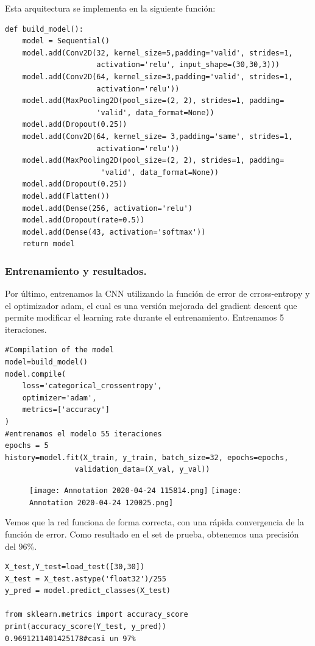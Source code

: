 \documentclass[a4paper,10pt]{article}
\begin{document}
Esta arquitectura se implementa en la siguiente función:
\begin{lstlisting}
def build_model():
    model = Sequential()
    model.add(Conv2D(32, kernel_size=5,padding='valid', strides=1, 
                     activation='relu', input_shape=(30,30,3)))
    model.add(Conv2D(64, kernel_size=3,padding='valid', strides=1,
                     activation='relu'))
    model.add(MaxPooling2D(pool_size=(2, 2), strides=1, padding=
                     'valid', data_format=None))
    model.add(Dropout(0.25))
    model.add(Conv2D(64, kernel_size= 3,padding='same', strides=1, 
                     activation='relu'))
    model.add(MaxPooling2D(pool_size=(2, 2), strides=1, padding=
                      'valid', data_format=None))
    model.add(Dropout(0.25))
    model.add(Flatten())
    model.add(Dense(256, activation='relu')
    model.add(Dropout(rate=0.5))
    model.add(Dense(43, activation='softmax'))
    return model
\end{lstlisting}

\subsubsection{Entrenamiento y resultados.}
Por último, entrenamos la CNN utilizando  la función de error de crross-entropy y el optimizador adam, el cual es una versión mejorada del gradient descent que permite modificar el learning rate durante el entrenamiento. Entrenamos 5 iteraciones.
\begin{lstlisting}
#Compilation of the model
model=build_model()
model.compile(
    loss='categorical_crossentropy', 
    optimizer='adam', 
    metrics=['accuracy']
)
#entrenamos el modelo 55 iteraciones
epochs = 5
history=model.fit(X_train, y_train, batch_size=32, epochs=epochs,
				validation_data=(X_val, y_val))
\end{lstlisting}
\begin{figure}[H]
\centering
\texttt{[image: Annotation 2020-04-24 115814.png]}\hfill
\texttt{[image: Annotation 2020-04-24 120025.png]}
\end{figure}

\noindent
Vemos que la red funciona de forma correcta, con una rápida convergencia de la función de error. Como resultado en el set de prueba, obtenemos una precisión del 96\%.

\begin{lstlisting}
X_test,Y_test=load_test([30,30])
X_test = X_test.astype('float32')/255 
y_pred = model.predict_classes(X_test)

from sklearn.metrics import accuracy_score
print(accuracy_score(Y_test, y_pred))
0.9691211401425178#casi un 97%
\end{lstlisting}
\end{document}
